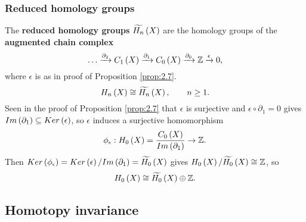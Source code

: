 \subsubsection{Reduced homology groups}

The \textbf{reduced homology groups} $ \widetilde{H_n}\left( X \right) $ are the homology groups of the \textbf{augmented chain complex}
$$ \dots \xrightarrow{\partial_2} C_1\left( X \right) \xrightarrow{\partial_1} C_0\left( X \right) \xrightarrow{\partial_0} \mathbb{Z} \xrightarrow{\epsilon} 0, $$
where $ \epsilon $ is as in proof of Proposition \ref{prop:2.7}.
$$ H_n\left( X \right) \cong \widetilde{H_n}\left( X \right), \qquad n \ge 1. $$
Seen in the proof of Proposition \ref{prop:2.7} that $ \epsilon $ is surjective and $ \epsilon \circ \partial_1 = 0 $ gives $ Im\left( \partial_1 \right) \subseteq Ker\left( \epsilon \right) $, so $ \epsilon $ induces a surjective homomorphism
$$ \phi_\epsilon : H_0\left( X \right) = \dfrac{C_0\left( X \right)}{Im\left( \partial_1 \right)} \to \mathbb{Z}. $$
Then $ Ker\left( \phi_\epsilon \right) = Ker\left( \epsilon \right) / Im\left( \partial_1 \right) = \widetilde{H_0}\left( X \right) $ gives $ H_0\left( X \right) / \widetilde{H_0}\left( X \right) \cong \mathbb{Z} $, so
$$ H_0\left( X \right) \cong \widetilde{H_0}\left( X \right) \oplus \mathbb{Z}. $$

\pagebreak

\subsection{Homotopy invariance}



